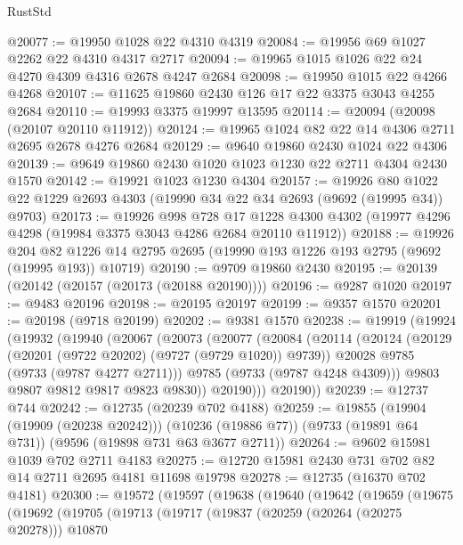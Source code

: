 \begin{lexlean}{RustStd}
\begin{coremodule}
@20077 := @19950 @1028 @22 @4310 @4319
@20084 := @19956 @69 @1027 @2262 @22 @4310 @4317 @2717
@20094 := @19965 @1015 @1026 @22 @24 @4270 @4309 @4316 @2678 @4247 @2684
@20098 := @19950 @1015 @22 @4266 @4268
@20107 := @11625 @19860 @2430 @126 @17 @22 @3375 @3043 @4255 @2684
@20110 := @19993 @3375 @19997 @13595
@20114 := @20094 (@20098 (@20107 @20110 @11912))
@20124 := @19965 @1024 @82 @22 @14 @4306 @2711 @2695 @2678 @4276 @2684
@20129 := @9640 @19860 @2430 @1024 @22 @4306
@20139 := @9649 @19860 @2430 @1020 @1023 @1230 @22 @2711 @4304 @2430 @1570
@20142 := @19921 @1023 @1230 @4304
@20157 := @19926
    @80
    @1022
    @22
    @1229
    @2693
    @4303
    (@19990 @34 @22 @34 @2693 (@9692 (@19995 @34)) @9703)
@20173 := @19926
    @998
    @728
    @17
    @1228
    @4300
    @4302
    (@19977 @4296 @4298 (@19984 @3375 @3043 @4286 @2684 @20110 @11912))
@20188 := @19926
    @204
    @82
    @1226
    @14
    @2795
    @2695
    (@19990 @193 @1226 @193 @2795 (@9692 (@19995 @193)) @10719)
@20190 := @9709 @19860 @2430
@20195 := @20139 (@20142 (@20157 (@20173 (@20188 @20190))))
@20196 := @9287 @1020
@20197 := @9483 @20196
@20198 := @20195 @20197
@20199 := @9357 @1570
@20201 := @20198 (@9718 @20199)
@20202 := @9381 @1570
@20238 := @19919
    (@19924
      (@19932
        (@19940
          (@20067
            (@20073
              (@20077
                (@20084
                  (@20114
                    (@20124
                      (@20129 (@20201 (@9722 @20202) (@9727 (@9729 @1020)) @9739))
                      @20028
                      @9785
                      (@9733 (@9787 @4277 @2711)))
                    @9785
                    (@9733 (@9787 @4248 @4309)))
                  @9803
                  @9807
                  @9812
                  @9817
                  @9823
                  @9830))
              @20190)))
        @20190))
@20239 := @12737 @744
@20242 := @12735 (@20239 @702 @4188)
@20259 := @19855
    (@19904 (@19909 (@20238 @20242)))
    (@10236 (@19886 @77))
    (@9733 (@19891 @64 @731))
    (@9596 (@19898 @731 @63 @3677 @2711))
@20264 := @9602 @15981 @1039 @702 @2711 @4183
@20275 := @12720 @15981 @2430 @731 @702 @82 @14 @2711 @2695 @4181 @11698 @19798
@20278 := @12735 (@16370 @702 @4181)
@20300 := @19572
    (@19597
      (@19638
        (@19640
          (@19642
            (@19659
              (@19675
                (@19692
                  (@19705
                    (@19713
                      (@19717
                        (@19837
                          (@20259 (@20264 (@20275 @20278)))
                          @10870

\end{coremodule}
\end{lexlean}
